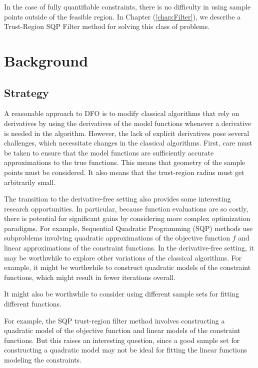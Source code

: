\documentclass{article}
\let\oldref\ref
\renewcommand{\ref}[1]{(\oldref{#1})}
\begin{document}
In the case of fully quantifiable constraints, there is no difficulty in using sample points outside of the feasible region.  
In Chapter \ref{chap:Filter}, we describe a Trust-Region SQP Filter method for solving this class of problems.

  
  
  
\section{Background}

\subsection{Strategy}
A reasonable approach to DFO is to modify classical algorithms that rely on derivatives by using the derivatives of the model functions whenever a derivative is needed in the algorithm.
However, the lack of explicit derivatives pose several challenges, which necessitate changes in the classical algorithms.
First, care must be taken to ensure that the model functions are sufficiently accurate approximations to the true functions.
This means that geometry of the sample points must be considered.
It also means that the trust-region radius must get arbitrarily small.

The transition to the derivative-free setting also provides some interesting research opportunities.
In particular, because function evaluations are so costly, there is potential for significant gains by considering more complex optimization paradigms.
For example, Sequential Quadratic Programming (SQP) methods use subproblems involving quadratic approximations of the objective function $f$ and linear approximations of the constraint functions.
In the derivative-free setting, it may be worthwhile to explore other variations of the classical algorithms.
For example, it might be worthwhile to construct quadratic models of the constraint functions, which might result in fewer iterations overall.

It might also be worthwhile to consider using different sample sets for fitting different functions.  

For example, the SQP trust-region filter method involves constructing a quadratic model of the objective function and linear models of the constraint functions.  But this raises an interesting question, since a good sample set for constructing a quadratic model may not be ideal for fitting the linear functions modeling the constraints.  
\end{document}
